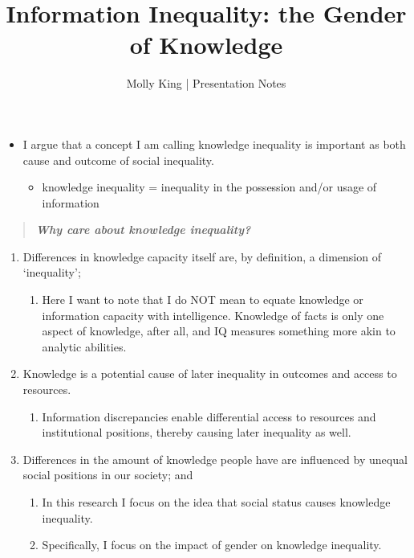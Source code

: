 \documentclass[]{article}
\begin{document}
 \title{\vspace{-1.0cm}Information Inequality: the Gender of Knowledge}
 \date{}
 \author{Molly King  |  Presentation Notes}

 \maketitle

\begin{itemize}
  \item{I argue that a concept I am calling knowledge inequality is important as both cause and outcome of social inequality.}
    \begin{itemize}
      \item{knowledge inequality = inequality in the possession and/or usage of information}
    \end{itemize}
\end{itemize}


\begin{quote}
  \emph{\textbf{Why care about knowledge inequality?}}
\end{quote}




\begin{enumerate}
  \item{Differences in knowledge capacity itself are, by definition, a dimension of `inequality';}
    \begin{enumerate}
      \item{Here I want to note that I do NOT mean to equate knowledge or information capacity with intelligence. Knowledge of facts is only one aspect of knowledge, after all, and IQ measures something more akin to analytic abilities.}
    \end{enumerate}

  \item{Knowledge is a potential cause of later inequality in outcomes and access to resources.}
    \begin{enumerate}
      \item{Information discrepancies enable differential access to resources and institutional positions, thereby causing later inequality as well.}
    \end{enumerate}

  \item{Differences in the amount of knowledge people have are influenced by unequal social positions in our society; and}
    \begin{enumerate}
      \item{In this research I focus on the idea that social status causes knowledge inequality.}
      \item{Specifically, I focus on the impact of gender on knowledge inequality.}
    \end{enumerate}
\end{enumerate}
\end{document}
